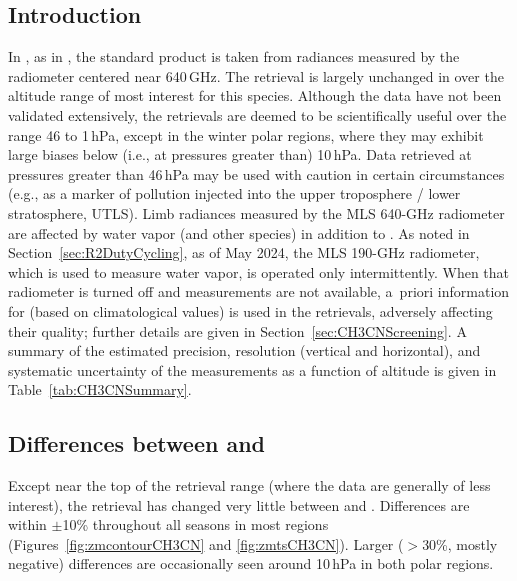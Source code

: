 
\subsection{Introduction}

In \thisv, as in \prevv, the standard  product is taken from radiances measured by the radiometer centered near 640\,GHz. The  retrieval is largely unchanged in \thisv over the altitude range of most interest for this species. Although the data have not been validated extensively, the \thisv {} retrievals are deemed to be scientifically useful over the range 46 to 1\,hPa, except in the winter polar regions, where they may exhibit large biases below (i.e., at pressures greater than) 10\,hPa. Data retrieved at pressures greater than 46\,hPa may be used with caution in certain circumstances (e.g., as a marker of pollution injected into the upper troposphere / lower stratosphere, UTLS). Limb radiances measured by the MLS \mbox{640-GHz} radiometer are affected by water vapor (and other species) in addition to . As noted in Section~\ref{sec:R2DutyCycling}, as of May 2024, the MLS \mbox{190-GHz} radiometer, which is used to measure water vapor, is operated only intermittently. When that radiometer is turned off and  measurements are not available, a~priori information for  (based on climatological values) is used in the  retrievals, adversely affecting their quality; further details are given in Section~\ref{sec:CH3CNScreening}. A summary of the estimated precision, resolution (vertical and horizontal), and systematic uncertainty of the \thisv {} measurements as a function of altitude is given in Table~\ref{tab:CH3CNSummary}.

\subsection{Differences between \prevv and \thisv}

Except near the top of the retrieval range (where the data are generally of less interest), the  retrieval has changed very little between \prevv and \thisv. Differences are within $\pm$10\% throughout all seasons in most regions (Figures~\ref{fig:zmcontourCH3CN} and \ref{fig:zmtsCH3CN}). Larger ($>$30\%, mostly negative) differences are occasionally seen around 10\,hPa in both polar regions.

